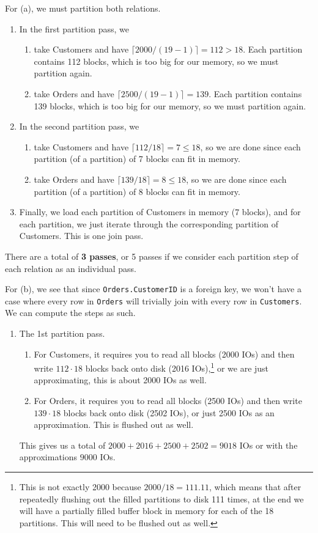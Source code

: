 \begin{example}
    For (a), we must partition both relations. 
    \begin{enumerate}
      \item In the first partition pass, we 
        \begin{enumerate}
          \item take Customers and have $\lceil 2000 / (19 - 1) \rceil = 112 > 18$. Each partition contains 112 blocks, which is too big for our memory, so we must partition again.
          \item take Orders and have $\lceil 2500 / (19 - 1) \rceil = 139$. Each partition contains 139 blocks, which is too big for our memory, so we must partition again.
        \end{enumerate}
      \item In the second partition pass, we 
        \begin{enumerate}
          \item take Customers and have $\lceil 112 / 18 \rceil = 7 \leq 18$, so we are done since each partition (of a partition) of 7 blocks can fit in memory.  
          \item take Orders and have $\lceil 139 / 18 \rceil = 8 \leq 18$, so we are done since each partition (of a partition) of 8 blocks can fit in memory.  
        \end{enumerate}
      \item Finally, we load each partition of Customers in memory (7 blocks), and for each partition, we just iterate through the corresponding partition of Customers. This is one join pass. 
    \end{enumerate}
    There are a total of \textbf{3 passes}, or 5 passes if we consider each partition step of each relation as an individual pass. 

    For (b), we see that since \texttt{Orders.CustomerID} is a foreign key, we won't have a case where every row in \texttt{Orders} will trivially join with every row in \texttt{Customers}. We can compute the steps as such. 
    \begin{enumerate}
      \item The 1st partition pass. 
        \begin{enumerate}
          \item For Customers, it requires you to read all blocks (2000 IOs) and then write $112 \cdot 18$ blocks back onto disk (2016 IOs),\footnote{This is not exactly 2000 because $2000 / 18 = 111.11$, which means that after repeatedly flushing out the filled partitions to disk 111 times, at the end we will have a partially filled buffer block in memory for each of the 18 partitions. This will need to be flushed out as well.} or we are just approximating, this is about 2000 IOs as well.  
          \item For Orders, it requires you to read all blocks (2500 IOs) and then write $139 \cdot 18$ blocks back onto disk (2502 IOs), or just 2500 IOs as an approximation. This is flushed out as well. 
        \end{enumerate}
        This gives us a total of $2000 + 2016 + 2500 + 2502 = 9018$ IOs or with the approximations $9000$ IOs. 


\end{enumerate}
\end{example}
